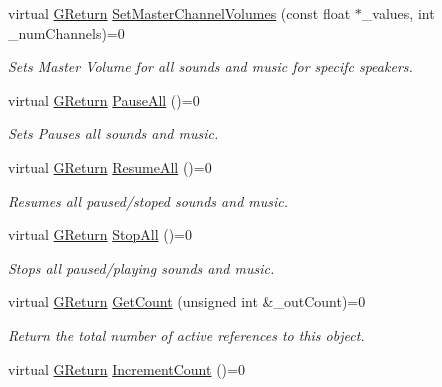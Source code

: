 \begin{DoxyCompactItemize}
virtual \mbox{\hyperlink{namespace_g_w_a67a839e3df7ea8a5c5686613a7a3de21}{G\+Return}} \mbox{\hyperlink{class_g_w_1_1_a_u_d_i_o_1_1_g_audio_a51217fba0337b4e67bf43f77ba69a074}{Set\+Master\+Channel\+Volumes}} (const float $\ast$\+\_\+values, int \+\_\+num\+Channels)=0
\begin{DoxyCompactList}\small\item\em Sets Master Volume for all sounds and music for specifc speakers. \end{DoxyCompactList}\item 
virtual \mbox{\hyperlink{namespace_g_w_a67a839e3df7ea8a5c5686613a7a3de21}{G\+Return}} \mbox{\hyperlink{class_g_w_1_1_a_u_d_i_o_1_1_g_audio_a1192a2665c74ea67f4ea52d95d444cef}{Pause\+All}} ()=0
\begin{DoxyCompactList}\small\item\em Sets Pauses all sounds and music. \end{DoxyCompactList}\item 
virtual \mbox{\hyperlink{namespace_g_w_a67a839e3df7ea8a5c5686613a7a3de21}{G\+Return}} \mbox{\hyperlink{class_g_w_1_1_a_u_d_i_o_1_1_g_audio_a230edcaf3c03919d3ba86fdc16b1893f}{Resume\+All}} ()=0
\begin{DoxyCompactList}\small\item\em Resumes all paused/stoped sounds and music. \end{DoxyCompactList}\item 
virtual \mbox{\hyperlink{namespace_g_w_a67a839e3df7ea8a5c5686613a7a3de21}{G\+Return}} \mbox{\hyperlink{class_g_w_1_1_a_u_d_i_o_1_1_g_audio_aa2571a54d993e8f3f47a32bdf31f6e60}{Stop\+All}} ()=0
\begin{DoxyCompactList}\small\item\em Stops all paused/playing sounds and music. \end{DoxyCompactList}\item 
virtual \mbox{\hyperlink{namespace_g_w_a67a839e3df7ea8a5c5686613a7a3de21}{G\+Return}} \mbox{\hyperlink{class_g_w_1_1_a_u_d_i_o_1_1_g_audio_a079dfab7b9db1536b10c9d2afa20c89c}{Get\+Count}} (unsigned int \&\+\_\+out\+Count)=0
\begin{DoxyCompactList}\small\item\em Return the total number of active references to this object. \end{DoxyCompactList}\item 
virtual \mbox{\hyperlink{namespace_g_w_a67a839e3df7ea8a5c5686613a7a3de21}{G\+Return}} \mbox{\hyperlink{class_g_w_1_1_a_u_d_i_o_1_1_g_audio_aba5697a3a308026ecaa12737d6fe6705}{Increment\+Count}} ()=0

\end{DoxyCompactItemize}
